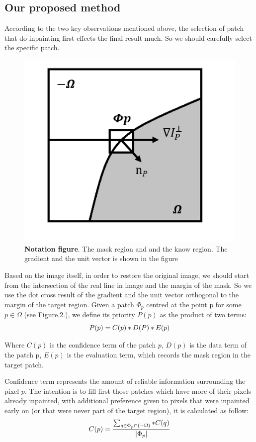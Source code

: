 \subsection{Our proposed method}
According to the two key observations mentioned above, the selection of patch that do inpainting first effects the final result much. So we should carefully select the specific patch. 
\begin{figure}
	\centering
	\includegraphics[width=0.94\linewidth]{region.jpg}
	\caption{\textbf{Notation figure}. The mask region and and the know region. The gradient and the unit vector is shown in the figure}
\end{figure}

Based on the image itself, in order to restore the original image, we should start from the intersection of the real line in image and the margin of the mask. So we use the dot cross result of the gradient and the unit vector orthogonal to the margin of the target region. Given a patch $\Phi_p$ centred at the point p for some $p \in \Omega$ (see Figure.2.), we define its priority $P(p)$ as the product of two terms:
\begin{equation*}
\centering
P(p)=C(p)*D(P)*E(p)
\nonumber
\end{equation*}

Where $C(p)$ is the confidence term of the patch $p$, $D(p)$ is the data term of the patch p, $E(p)$ is the evaluation term, which records the mask region in the target patch. 

Confidence term represents the amount of reliable information surrounding the pixel $p$. The
intention is to fill first those patches which have more of their pixels already inpainted, with additional preference given to pixels that were inpainted early on (or that were never part of the target region), it is calculated as follow:
\begin{equation*}
\centering
C(p)=\frac{\sum_{q\in \Phi _p\cap(-\Omega)}*C(q)}{|\Phi_p|}
\nonumber
\end{equation*}


